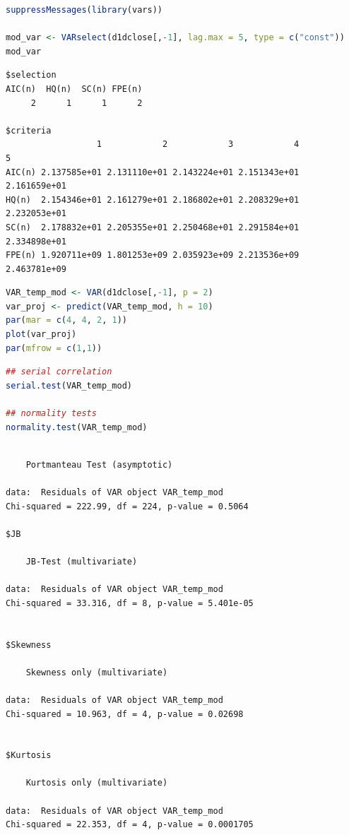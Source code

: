 \documentclass[a4paper]{article}
\begin{document}
\begin{lstlisting}[language=r,label=lst:orgde77e44,caption={Question 2 VAR model initialisation},captionpos=b,numbers=none]
suppressMessages(library(vars))

mod_var <- VARselect(d1dclose[,-1], lag.max = 5, type = c("const"))
mod_var
\end{lstlisting}

\label{orgb771e0b}
\begin{verbatim}
$selection
AIC(n)  HQ(n)  SC(n) FPE(n) 
     2      1      1      2 

$criteria
                  1            2            3            4            5
AIC(n) 2.137585e+01 2.131110e+01 2.143224e+01 2.151343e+01 2.161659e+01
HQ(n)  2.154346e+01 2.161279e+01 2.186802e+01 2.208329e+01 2.232053e+01
SC(n)  2.178832e+01 2.205355e+01 2.250468e+01 2.291584e+01 2.334898e+01
FPE(n) 1.920711e+09 1.801253e+09 2.035923e+09 2.213536e+09 2.463781e+09
\end{verbatim}

\begin{lstlisting}[language=r,label=lst:org0370fd4,caption={Question 2: VAR Forecasting},captionpos=b,numbers=none]
VAR_temp_mod <- VAR(d1dclose[,-1], p = 2)
var_proj <- predict(VAR_temp_mod, h = 10)
par(mar = c(4, 4, 2, 1))
plot(var_proj)
par(mfrow = c(1,1))
\end{lstlisting}

\begin{lstlisting}[language=r,label=lst:org836a4a6,caption={Question 2: VAR post-regression statistics},captionpos=b,numbers=none]
## serial correlation
serial.test(VAR_temp_mod)

## normality tests
normality.test(VAR_temp_mod)
\end{lstlisting}

\label{org657b557}
\begin{verbatim}

	Portmanteau Test (asymptotic)

data:  Residuals of VAR object VAR_temp_mod
Chi-squared = 222.99, df = 224, p-value = 0.5064

$JB

	JB-Test (multivariate)

data:  Residuals of VAR object VAR_temp_mod
Chi-squared = 33.316, df = 8, p-value = 5.401e-05


$Skewness

	Skewness only (multivariate)

data:  Residuals of VAR object VAR_temp_mod
Chi-squared = 10.963, df = 4, p-value = 0.02698


$Kurtosis

	Kurtosis only (multivariate)

data:  Residuals of VAR object VAR_temp_mod
Chi-squared = 22.353, df = 4, p-value = 0.0001705
\end{verbatim}
\end{document}
